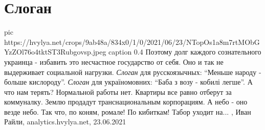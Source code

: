  
 
 
 
 
\chapter{Слоган}

\ifcmt
  pic https://hvylya.net/crops/9ab48a/834x0/1/0/2021/06/23/NTopOs1a8m7rtMObGYzZOl76o4tktST3Rubgovsp.jpeg
	caption 0.4
\fi
Поэтому долг каждого сознательного украинца - избавить это несчастное
государство от себя. Оно и так не выдерживает социальной нагрузки.
\emph{Слоган} для русскоязычных: \enquote{Меньше народу - больше кислороду}.
\emph{Слоган} для україномовних: \enquote{Баба з возу - кобилі легше}.  А что
нам терять?  Нормальной работы нет.  Квартиры все равно отберут за коммуналку.
Землю продадут транснациональным корпорациям.  А небо - оно везде небо.  Так
что, по коням, ромале!  По кибиткам! Табор уходит на...
, 
Иван Райли, analytics.hvylya.net, 23.06.2021

